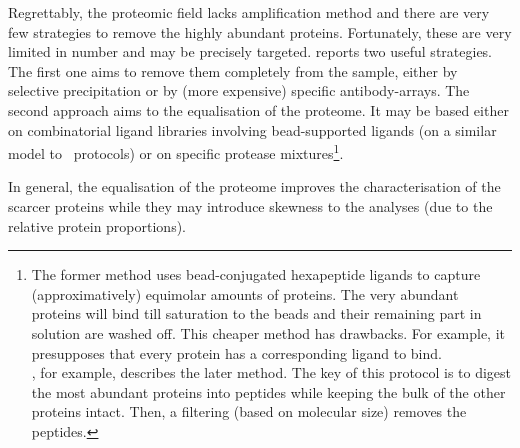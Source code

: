 Regrettably, the proteomic field lacks amplification method and
there are very few strategies to remove the highly abundant proteins. Fortunately,
these are very limited in number and may be precisely targeted.
\cite{Zhang2014} reports two useful strategies. The first one aims to remove
them completely from the sample, either by selective
precipitation or by (more expensive) specific antibody-arrays.
The second approach aims to the equalisation of the proteome.
It may be based either on combinatorial ligand libraries involving
bead-supported ligands (on a similar model to \Rnaseq\ protocols)
or on specific protease mixtures\footnote{The former method uses bead-conjugated
hexapeptide ligands to capture (approximatively) equimolar amounts of proteins.
The very abundant proteins will bind till saturation to the beads and their
remaining part in solution are washed off. This cheaper method has drawbacks.
For example, it presupposes that every protein has a corresponding ligand to bind.
\\\cite{MichaelMentenDepletion}, for example, describes the later method. The
key of this protocol is to digest the most abundant proteins into peptides while
keeping the bulk of the other proteins intact. Then, a filtering (based on
molecular size) removes the peptides.}.

In general, the equalisation of the proteome improves the characterisation
of the scarcer proteins  while they may introduce skewness
to the analyses (due to the relative protein proportions).

